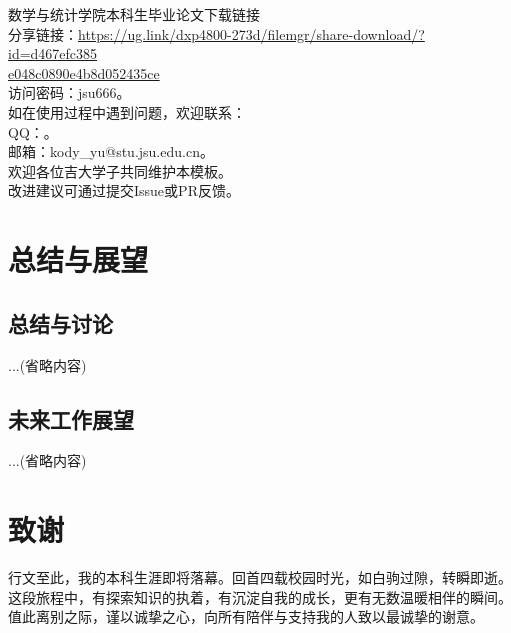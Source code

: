 \documentclass[12pt, a4paper, fontset=fandol]{ctexart}
\numberwithin{equation}{section}
\begin{document}
\vspace{\baselineskip}
\noindent 数学与统计学院本科生毕业论文下载链接\\
\noindent 分享链接：\href{https://ug.link/dxp4800-273d/filemgr/share-download/?id=d467efc385e048c0890e4b8d052435ce}{{\engfont https://ug.link/dxp4800-273d/filemgr/share-download/?id=d467efc385}}\\
\noindent \href{https://ug.link/dxp4800-273d/filemgr/share-download/?id=d467efc385e048c0890e4b8d052435ce}{{\engfont e048c0890e4b8d052435ce}}\\
\noindent 访问密码：{\engfont jsu666}。\\[\baselineskip]
\noindent 如在使用过程中遇到问题，欢迎联系：\\
\noindent QQ：{}。\\
\noindent 邮箱：{\engfont kody\_yu@stu.jsu.edu.cn}。\\
\noindent 欢迎各位吉大学子共同维护本模板。\\
\noindent 改进建议可通过提交{\engfont Issue}或{\engfont PR}反馈。


\section{总结与展望}

\subsection{总结与讨论}
...(省略内容)

\subsection{未来工作展望}
...(省略内容)

\clearpage


{}


\clearpage
\vspace*{-23pt}
\section*{致谢}
{}
行文至此，我的本科生涯即将落幕。回首四载校园时光，如白驹过隙，转瞬即逝。这段旅程中，有探索知识的执着，有沉淀自我的成长，更有无数温暖相伴的瞬间。值此离别之际，谨以诚挚之心，向所有陪伴与支持我的人致以最诚挚的谢意。
\end{document}
